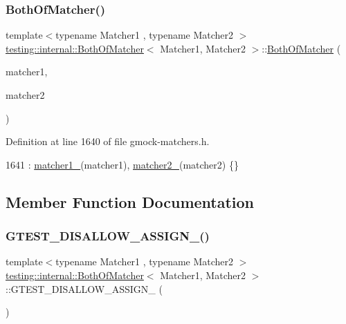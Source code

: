 \subsubsection{\texorpdfstring{Both\+Of\+Matcher()}{BothOfMatcher()}}
{\footnotesize\ttfamily template$<$typename Matcher1 , typename Matcher2 $>$ \\
\hyperlink{classtesting_1_1internal_1_1BothOfMatcher}{testing\+::internal\+::\+Both\+Of\+Matcher}$<$ Matcher1, Matcher2 $>$\+::\hyperlink{classtesting_1_1internal_1_1BothOfMatcher}{Both\+Of\+Matcher} (\begin{DoxyParamCaption}\item[{Matcher1}]{matcher1,  }\item[{Matcher2}]{matcher2 }\end{DoxyParamCaption})\hspace{0.3cm}{\ttfamily [inline]}}



Definition at line 1640 of file gmock-\/matchers.\+h.


\begin{DoxyCode}
1641       : \hyperlink{classtesting_1_1internal_1_1BothOfMatcher_a7aeed14276f48d927300a3e2ab23f702}{matcher1\_}(matcher1), \hyperlink{classtesting_1_1internal_1_1BothOfMatcher_a531d417ec0480876070ce9da6e0f71ae}{matcher2\_}(matcher2) \{\}
\end{DoxyCode}


\subsection{Member Function Documentation}
\mbox{\label{classtesting_1_1internal_1_1BothOfMatcher_a8d1c93372fdecb93eb2413e29f8424f6}} 
\subsubsection{\texorpdfstring{G\+T\+E\+S\+T\+\_\+\+D\+I\+S\+A\+L\+L\+O\+W\+\_\+\+A\+S\+S\+I\+G\+N\+\_\+()}{GTEST\_DISALLOW\_ASSIGN\_()}}
{\footnotesize\ttfamily template$<$typename Matcher1 , typename Matcher2 $>$ \\
\hyperlink{classtesting_1_1internal_1_1BothOfMatcher}{testing\+::internal\+::\+Both\+Of\+Matcher}$<$ Matcher1, Matcher2 $>$\+::G\+T\+E\+S\+T\+\_\+\+D\+I\+S\+A\+L\+L\+O\+W\+\_\+\+A\+S\+S\+I\+G\+N\+\_\+ (\begin{DoxyParamCaption}\item[{\hyperlink{classtesting_1_1internal_1_1BothOfMatcher}{Both\+Of\+Matcher}$<$ Matcher1, Matcher2 $>$}]{ }\end{DoxyParamCaption})\hspace{0.3cm}{\ttfamily [private]}}


